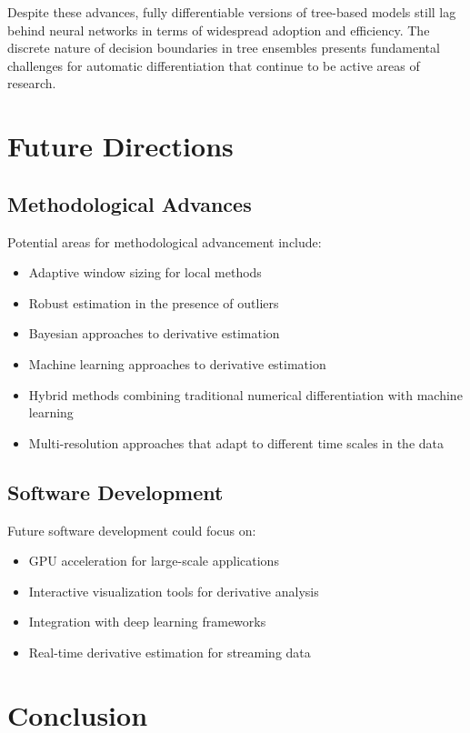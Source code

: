 \documentclass{article}
\begin{document}
Despite these advances, fully differentiable versions of tree-based models still lag behind neural networks in terms of widespread adoption and efficiency. The discrete nature of decision boundaries in tree ensembles presents fundamental challenges for automatic differentiation that continue to be active areas of research.

\section{Future Directions}

\subsection{Methodological Advances}

Potential areas for methodological advancement include:

\begin{itemize}
    \item Adaptive window sizing for local methods
    \item Robust estimation in the presence of outliers
    \item Bayesian approaches to derivative estimation
    \item Machine learning approaches to derivative estimation
    \item Hybrid methods combining traditional numerical differentiation with machine learning
    \item Multi-resolution approaches that adapt to different time scales in the data
\end{itemize}

\subsection{Software Development}

Future software development could focus on:

\begin{itemize}
    \item GPU acceleration for large-scale applications
    \item Interactive visualization tools for derivative analysis
    \item Integration with deep learning frameworks
    \item Real-time derivative estimation for streaming data
\end{itemize}

\section{Conclusion}
\end{document}
